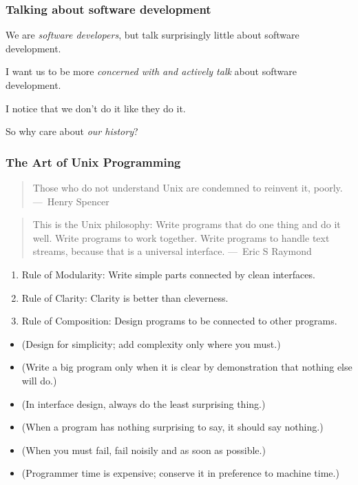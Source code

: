 \documentclass{beamer}
\begin{document}
\begin{frame}
  \frametitle{Talking about software development}

  We are \emph{software developers}, but talk surprisingly little about software
  development.

  I want us to be more \emph{concerned with and actively talk} about software
  development.

  I notice that we don't do it like they do it.

  So why care about \emph{our history}?
\end{frame}

\begin{frame}
  \frametitle{The Art of Unix Programming}

  \begin{quote}
    Those who do not understand Unix are condemned to reinvent it, poorly.
    ---~Henry Spencer
  \end{quote}

  \begin{quote}
    This is the Unix philosophy: Write programs that do one thing and do it
    well.  Write programs to work together.  Write programs to handle text
    streams, because that is a universal interface. ---~Eric S Raymond
  \end{quote}

  \begin{enumerate}
  \item Rule of Modularity: Write simple parts connected by clean interfaces.
  \item Rule of Clarity: Clarity is better than cleverness.
  \item Rule of Composition: Design programs to be connected to other programs.
  \end{enumerate}

  \begin{itemize}
  \item (Design for simplicity; add complexity only where you must.)
  \item (Write a big program only when it is clear by demonstration that nothing
    else will do.)
  \item (In interface design, always do the least surprising thing.)
  \item (When a program has nothing surprising to say, it should say nothing.)
  \item (When you must fail, fail noisily and as soon as possible.)
  \item (Programmer time is expensive; conserve it in preference to machine
    time.)
  \end{itemize}
\end{frame}
\end{document}
